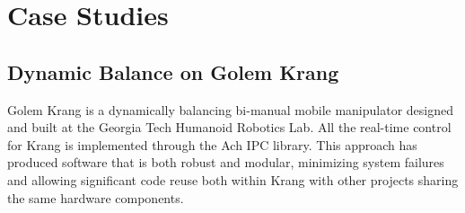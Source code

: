 \documentclass[letterpaper]{IEEEtran}
\begin{document}
\section{Case Studies}

\subsection{Dynamic Balance on Golem Krang}

Golem Krang \cite{stilman2010golem} is a dynamically balancing
bi-manual mobile manipulator designed and built at the Georgia Tech
Humanoid Robotics Lab.  All the real-time control for Krang is
implemented through the Ach IPC library.  This approach has produced
software that is both robust and modular, minimizing system failures
and allowing significant code reuse both within Krang with other
projects \cite{dantam2013tro} sharing the same hardware components.


\begin{figure}
\end{figure}
\end{document}
